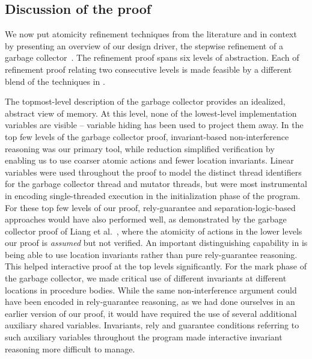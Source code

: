 \subsection{Discussion of the proof}
We now put atomicity refinement techniques from the literature and
\civl in context by presenting an overview of our design
driver, the stepwise refinement of a garbage collector~\cite{gc-techreport}.
The refinement proof spans six levels of abstraction. 
Each of refinement proof relating two consecutive levels is made feasible by a different
blend of the techniques in \civl. 

The topmost-level description of the garbage collector provides an
idealized, abstract view of memory. 
At this level, none of the lowest-level implementation variables are
visible -- variable hiding has been used to project them away. 
In the top few levels of the garbage collector proof, invariant-based
non-interference reasoning was our primary tool, while reduction
simplified verification by enabling us to use coarser atomic actions and fewer
location invariants.  
Linear variables were used throughout the proof to model the distinct
thread identifiers for the garbage collector thread and mutator
threads, but were most instrumental in encoding single-threaded
execution in the initialization phase of the program. 
For these top few levels of our proof, rely-guarantee and separation-logic-based
approaches would have also performed well, as demonstrated by the
garbage collector proof of Liang et al.~\cite{LiangRGSim}, where
the atomicity of actions in the lower levels our proof is {\em assumed} but not verified.
An important distinguishing capability in \civl is being able to use location invariants rather than pure rely-guarantee reasoning.
This helped interactive proof at the top levels significantly.
For the mark phase of the garbage collector, we made critical use of
different invariants at different locations in procedure bodies. 
While the same non-interference argument could have been encoded in
rely-guarantee reasoning, as we had done ourselves in an earlier
version of our proof, 
it would have required the use of several additional auxiliary shared variables. 
Invariants, rely and guarantee conditions referring to such auxiliary
variables throughout the program made interactive invariant reasoning more difficult to manage. 

